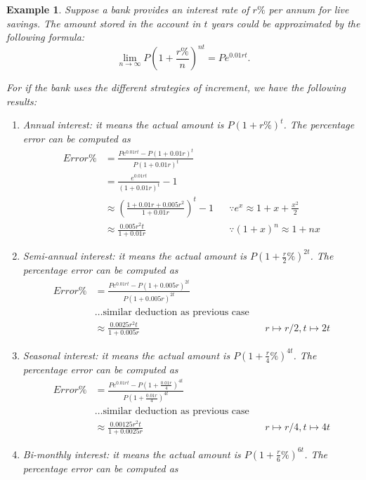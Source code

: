 \documentclass[12pt]{article}
\newtheorem*{example}{Example}
\begin{document}
    \begin{example}
        Suppose a bank provides an interest rate of $r\%$ per annum for live savings. The amount stored in the account in $t$ years could be approximated by the following formula: \[\lim_{n\to\infty} P(1+\frac{r\%}{n})^{nt}=Pe^{0.01rt}.\]

        For if the bank uses the different strategies of increment, we have the following results:\begin{enumerate}
            \item Annual interest: it means the actual amount is $P(1+r\%)^t$. The percentage error can be computed as \begin{align*}
                Error\% &=\frac{Pe^{0.01rt}-P(1+0.01r)^t}{P(1+0.01r)^t}\\
                &=\frac{e^{0.01rt}}{(1+0.01r)^t}-1\\
                &\approx (\frac{1+0.01r+0.005r^2}{1+0.01r})^t-1&&\because e^x \approx 1+x+\frac{x^2}{2}\\
                &\approx \frac{0.005r^2 t}{1+0.01r}&&\because(1+x)^n\approx 1+nx
            \end{align*}
            \item Semi-annual interest: it means the actual amount is $P(1+\frac{r}{2}\%)^{2t}$. The percentage error can be computed as \begin{align*}
                Error\% &=\frac{Pe^{0.01rt}-P(1+0.005r)^{2t}}{P(1+0.005r)^{2t}}\\
                & \dots \textrm{similar deduction as previous case}\\
                &\approx \frac{0.0025r^2 t}{1+0.005r}&&r\mapsto r/2, t\mapsto 2t
            \end{align*}
            \item Seasonal interest: it means the actual amount is $P(1+\frac{r}{4}\%)^{4t}$. The percentage error can be computed as \begin{align*}
                Error\% &=\frac{Pe^{0.01rt}-P(1+\frac{0.01r}{4})^{4t}}{P(1+\frac{0.01r}{4})^{4t}}\\
                & \dots \textrm{similar deduction as previous case}\\
                &\approx \frac{0.00125r^2 t}{1+0.0025r}&&r\mapsto r/4, t\mapsto 4t
            \end{align*}
            \item Bi-monthly interest: it means the actual amount is $P(1+\frac{r}{6}\%)^{6t}$. The percentage error can be computed as \begin{align*}

\end{align*}
\end{enumerate}
\end{example}
\end{document}
